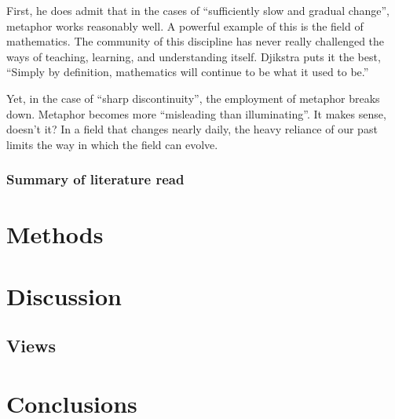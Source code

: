 \documentclass[11pt, oneside]{article}   	%
\begin{document}
First, he does admit that in the cases of ``sufficiently slow and gradual change'', metaphor works reasonably well. A powerful example of this is the field of mathematics. The community of this discipline has never really challenged the ways of teaching, learning, and understanding itself. Djikstra puts it the best, ``Simply by definition, mathematics will continue to be what it used to be.''

Yet, in the case of ``sharp discontinuity'', the employment of metaphor breaks down. Metaphor becomes more ``misleading than illuminating''. It makes sense, doesn't it? In a field that changes nearly daily, the heavy reliance of our past limits the way in which the field can evolve. \cite{ewd1036}

\subsubsection{Summary of literature read}

\section{Methods}
\section{Discussion}
\subsection{Views}

\section{Conclusions}




\end{document}
